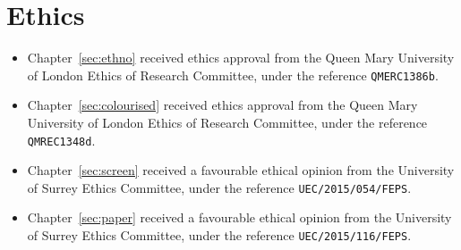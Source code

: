 \chapter*{Ethics}

\begin{itemize}
  \item Chapter~\ref{sec:ethno} received ethics approval from the Queen Mary University of
    London Ethics of Research Committee, under the reference \texttt{QMERC1386b}.
  \item Chapter~\ref{sec:colourised} received ethics approval from the Queen Mary University of
    London Ethics of Research Committee, under the reference \texttt{QMREC1348d}.
  \item Chapter~\ref{sec:screen} received a favourable ethical opinion from the University of Surrey Ethics
    Committee, under the reference \texttt{UEC/2015/054/FEPS}.
  \item Chapter~\ref{sec:paper} received a favourable ethical opinion from the University of Surrey Ethics
    Committee, under the reference \texttt{UEC/2015/116/FEPS}.
\end{itemize}

